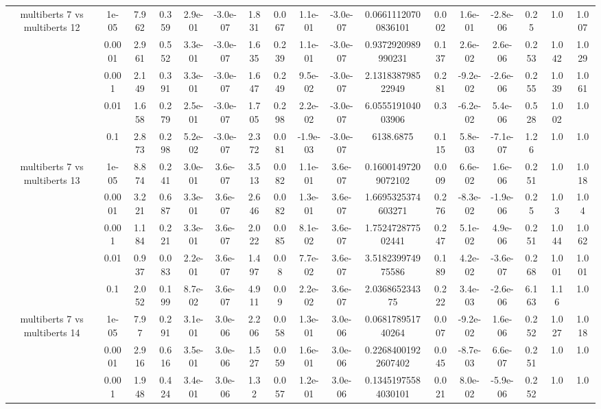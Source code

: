 \begin{tabular}{|c|c|c|c|c|c|c|c|c|c|c|c|c|c|c|c|c|}
\hline
\multirow{5}{*}{multiberts 7 vs multiberts 12} & 1e-05 & 7.962 & 0.359 & 2.9e-01 & -3.0e-07 & 1.831 & 0.067 & 1.1e-01 & -3.0e-07 & 0.06611120700836101 & 0.002 & 1.6e-01 & -2.8e-06 & 0.25 & 1.0 & 1.007 \\
 & 0.0001 & 2.961 & 0.552 & 3.3e-01 & -3.0e-07 & 1.635 & 0.239 & 1.1e-01 & -3.0e-07 & 0.9372920989990231 & 0.137 & 2.6e-02 & 2.6e-06 & 0.253 & 1.042 & 1.029 \\
 & 0.001 & 2.149 & 0.391 & 3.3e-01 & -3.0e-07 & 1.647 & 0.249 & 9.5e-02 & -3.0e-07 & 2.131838798522949 & 0.281 & -9.2e-02 & -2.6e-06 & 0.255 & 1.039 & 1.061 \\
 & 0.01 & 1.658 & 0.279 & 2.5e-01 & -3.0e-07 & 1.705 & 0.298 & 2.2e-02 & -3.0e-07 & 6.055519104003906 & 0.3 & -6.2e-02 & 5.4e-06 & 0.528 & 1.002 & 1.0 \\
 & 0.1 & 2.873 & 0.298 & 5.2e-02 & -3.0e-07 & 2.372 & 0.081 & -1.9e-03 & -3.0e-07 & 6138.6875 & 0.115 & 5.8e-03 & -7.1e-07 & 1.26 & 1.0 & 1.0 \\
\hline
\multirow{5}{*}{multiberts 7 vs multiberts 13} & 1e-05 & 8.874 & 0.241 & 3.0e-01 & 3.6e-07 & 3.513 & 0.082 & 1.1e-01 & 3.6e-07 & 0.16001497209072102 & 0.009 & 6.6e-02 & 1.6e-06 & 0.251 & 1.0 & 1.018 \\
 & 0.0001 & 3.221 & 0.687 & 3.3e-01 & 3.6e-07 & 2.646 & 0.082 & 1.3e-01 & 3.6e-07 & 1.6695325374603271 & 0.276 & -8.3e-02 & -1.9e-06 & 0.25 & 1.03 & 1.04 \\
 & 0.001 & 1.184 & 0.221 & 3.3e-01 & 3.6e-07 & 2.022 & 0.085 & 8.1e-02 & 3.6e-07 & 1.752472877502441 & 0.247 & 5.1e-02 & 4.9e-06 & 0.251 & 1.044 & 1.062 \\
 & 0.01 & 0.937 & 0.083 & 2.2e-01 & 3.6e-07 & 1.497 & 0.08 & 7.7e-02 & 3.6e-07 & 3.518239974975586 & 0.189 & 4.2e-02 & -3.6e-07 & 0.268 & 1.001 & 1.001 \\
 & 0.1 & 2.052 & 0.199 & 8.7e-02 & 3.6e-07 & 4.911 & 0.09 & 2.2e-02 & 3.6e-07 & 2.036865234375 & 0.222 & 3.4e-03 & -2.6e-06 & 6.163 & 1.16 & 1.0 \\
\hline
\multirow{5}{*}{multiberts 7 vs multiberts 14} & 1e-05 & 7.97 & 0.291 & 3.1e-01 & 3.0e-06 & 2.206 & 0.058 & 1.3e-01 & 3.0e-06 & 0.068178951740264 & 0.007 & -9.2e-02 & 1.6e-06 & 0.252 & 1.027 & 1.018 \\
 & 0.0001 & 2.916 & 0.616 & 3.5e-01 & 3.0e-06 & 1.527 & 0.059 & 1.6e-01 & 3.0e-06 & 0.22684001922607402 & 0.045 & -8.7e-03 & 6.6e-07 & 0.251 & 1.0 & 1.0 \\
 & 0.001 & 1.948 & 0.424 & 3.4e-01 & 3.0e-06 & 1.32 & 0.057 & 1.2e-01 & 3.0e-06 & 0.13451975584030101 & 0.021 & 8.0e-02 & -5.9e-06 & 0.252 & 1.0 & 1.0 \\

\end{tabular}
